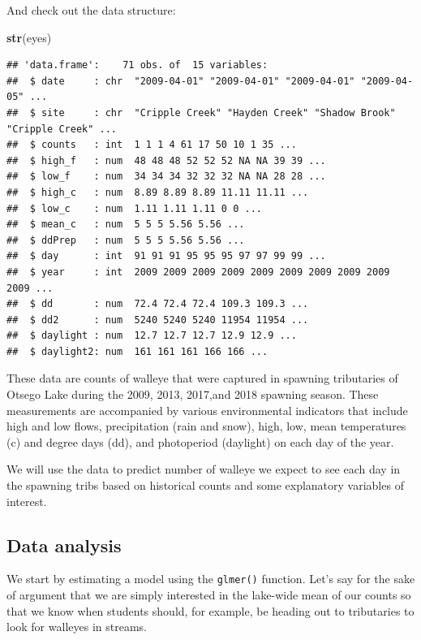 \documentclass[
]{book}
\newenvironment{Shaded}{\begin{snugshade}}{\end{snugshade}}
\newcommand{\KeywordTok}[1]{\textcolor[rgb]{0.13,0.29,0.53}{\textbf{#1}}}
\newcommand{\NormalTok}[1]{#1}
\begin{document}
And check out the data structure:

\begin{Shaded}
\begin{Highlighting}[]
\KeywordTok{str}\NormalTok{(eyes)}
\end{Highlighting}
\end{Shaded}

\begin{verbatim}
## 'data.frame':	71 obs. of  15 variables:
##  $ date     : chr  "2009-04-01" "2009-04-01" "2009-04-01" "2009-04-05" ...
##  $ site     : chr  "Cripple Creek" "Hayden Creek" "Shadow Brook" "Cripple Creek" ...
##  $ counts   : int  1 1 1 4 61 17 50 10 1 35 ...
##  $ high_f   : num  48 48 48 52 52 52 NA NA 39 39 ...
##  $ low_f    : num  34 34 34 32 32 32 NA NA 28 28 ...
##  $ high_c   : num  8.89 8.89 8.89 11.11 11.11 ...
##  $ low_c    : num  1.11 1.11 1.11 0 0 ...
##  $ mean_c   : num  5 5 5 5.56 5.56 ...
##  $ ddPrep   : num  5 5 5 5.56 5.56 ...
##  $ day      : int  91 91 91 95 95 95 97 97 99 99 ...
##  $ year     : int  2009 2009 2009 2009 2009 2009 2009 2009 2009 2009 ...
##  $ dd       : num  72.4 72.4 72.4 109.3 109.3 ...
##  $ dd2      : num  5240 5240 5240 11954 11954 ...
##  $ daylight : num  12.7 12.7 12.7 12.9 12.9 ...
##  $ daylight2: num  161 161 161 166 166 ...
\end{verbatim}

These data are counts of walleye that were captured in spawning tributaries of Otsego Lake during the 2009, 2013, 2017,and 2018 spawning season. These measurements are accompanied by various environmental indicators that include high and low flows, precipitation (rain and snow), high, low, mean temperatures (c) and degree days (dd), and photoperiod (daylight) on each day of the year.

We will use the data to predict number of walleye we expect to see each day in the spawning tribs based on historical counts and some explanatory variables of interest.

\hypertarget{glmm-count-analysis}{%
\subsection{Data analysis}\label{glmm-count-analysis}}

We start by estimating a model using the \texttt{glmer()} function. Let's say for the sake of argument that we are simply interested in the lake-wide mean of our counts so that we know when students should, for example, be heading out to tributaries to look for walleyes in streams.
\end{document}
